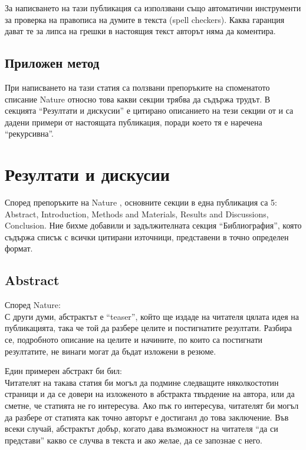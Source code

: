 \documentclass[11pt, oneside]{article}     %
\begin{document}
За написването на тази публикация са използвани също автоматични инструменти за проверка на правописа на думите в текста (spell checkers). Каква гаранция дават те за липса на грешки в настоящия текст авторът няма да коментира.

\subsection*{Приложен метод}


При написването на тази статия са ползвани препоръките на споменатото списание Nature \cite{nature} относно това какви секции трябва да съдържа трудът. В секцията ``Резултати и дискусии'' е цитирано описанието на тези секции от \cite{nature} и са дадени примери от настоящата публикация, поради което тя е наречена ``рекурсивна''.

\section {Резултати и дискусии}

Според препоръките на Nature \cite{nature}, основните секции в една публикация са 5: Abstract, Introduction, Methods and Materials, Results and Discussions, Conclusion. Ние бихме добавили и задължителната секция ``Библиография'', която съдържа списък с всички цитирани източници, представени в точно определен формат.

\subsection*{Abstract}


Според Nature:\\
С други думи, абстрактът е ``teaser'', който ще издаде на читателя цялата идея на публикацията, така че той да разбере целите и постигнатите резултати. Разбира се, подробното описание на целите и начините, по които са постигнати резултатите, не винаги могат да бъдат изложени в резюме. 

Един примерен абстракт би бил:\\
Читателят на такава статия би могъл да подмине следващите няколкостотин страници и да се довери на изложеното в абстракта твърдение на автора, или да сметне, че статията не го интересува. Ако пък го интересува, читателят би могъл да разбере от статията как точно авторът е достиганл до това заключение. Във всеки случай, абстрактът добър, когато дава възможност на читателя ``да си представи'' какво се случва в текста и ако желае, да се запознае с него.
\end{document}
